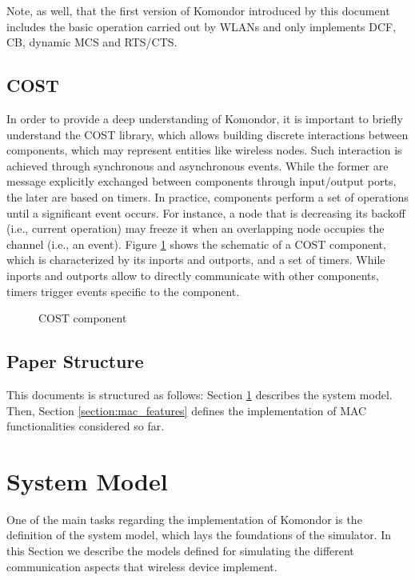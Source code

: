 \documentclass[a4paper]{article}
\begin{document}
	Note, as well, that the first version of Komondor introduced by this document includes the basic operation carried out by WLANs and only implements DCF, CB, dynamic MCS and RTS/CTS.
	
	\subsection{COST}
	\label{section:cost}
	In order to provide a deep understanding of Komondor, it is important to briefly understand the COST library, which allows building discrete interactions between components, which may represent entities like wireless nodes. Such interaction is achieved through synchronous and asynchronous events. While the former are message explicitly exchanged between components through input/output ports, the later are based on timers. In practice, components perform a set of operations until a significant event occurs. For instance, a node that is decreasing its backoff (i.e., current operation) may freeze it when an overlapping node occupies the channel (i.e., an event). Figure \ref{fig:cost} shows the schematic of a COST component, which is characterized by its inports and outports, and a set of timers. While inports and outports allow to directly communicate with other components, timers trigger events specific to the component.
	\begin{figure}[h!]
		\centering
		\caption{COST component}
		\label{fig:cost}
	\end{figure}	
	
	\subsection{Paper Structure}
	\label{section:structure}
	This documents is structured as follows: Section \ref{section:system_model} describes the system model. Then, Section \ref{section:mac_features} defines the implementation of MAC functionalities considered so far.
	
\section{System Model}
\label{section:system_model}
One of the main tasks regarding the implementation of Komondor is the definition of the system model, which lays the foundations of the simulator. In this Section we describe the models defined for simulating the different communication aspects that wireless device implement.
	
\end{document}
